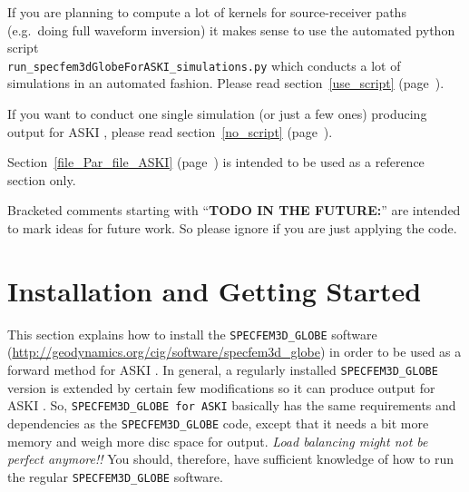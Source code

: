 \documentclass[12pt,a4paper]{article}
\newcommand{\lcode}[1]{\nolinkurl{#1}}
\newcommand{\ASKI}{ {\ttfamily ASKI} }
\newcommand{\myref}[1]{\ref{#1} (page~\pageref{#1})}
\begin{document}
If you are planning to compute a lot of kernels for source-receiver paths (e.g.\ doing full waveform inversion) 
it makes sense to use the automated python script \\ \lcode{run_specfem3dGlobeForASKI_simulations.py} 
which conducts a lot of simulations in an automated fashion. Please read section~\myref{use_script}. 

If you want to conduct one single simulation (or just a few ones) producing output for \ASKI{}, please 
read section~\myref{no_script}.

Section~\myref{file_Par_file_ASKI} is intended to be used as a reference section only.

Bracketed comments starting with ``{\bf TODO IN THE FUTURE:}'' are intended to mark ideas for future work. 
So please ignore if you are just applying the code.
%
\newpage
\tableofcontents
\newpage
%
\section{Installation and Getting Started} \label{install}
%
This section explains how to install the \lcode{SPECFEM3D_GLOBE} software 
(\url{http://geodynamics.org/cig/software/specfem3d_globe})
in order to be used as a forward method for \ASKI{}. 
In general, a regularly installed \lcode{SPECFEM3D_GLOBE} version is extended by certain few modifications 
so it can produce output for \ASKI{}. So, \lcode{SPECFEM3D_GLOBE for ASKI} basically has the same requirements 
and dependencies as the \lcode{SPECFEM3D_GLOBE} code, except that it needs a bit more memory and weigh more 
disc space for output. \emph{Load balancing might not be perfect anymore!!} You should, therefore, have sufficient 
knowledge of how to run the regular \lcode{SPECFEM3D_GLOBE} software. 

\end{document}
